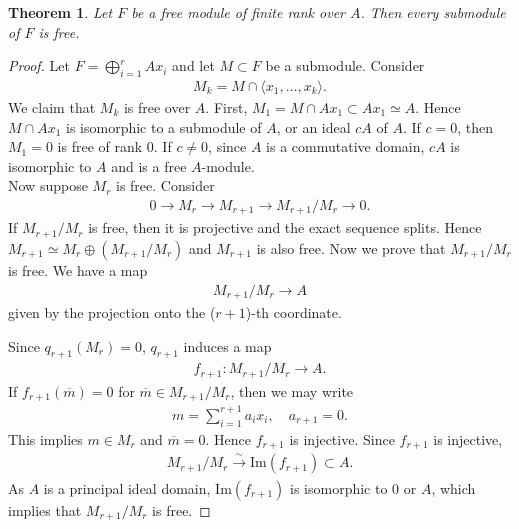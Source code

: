 \documentclass[12pt]{report}
\theoremstyle{plain}
\newtheorem{theorem}{Theorem}[section]
\theoremstyle{remark}
\theoremstyle{definition}
\begin{document}
\begin{theorem}
    Let $F$ be a free module of finite rank over $A$. Then every submodule of $F$ is free.
\end{theorem}
\begin{proof}
    Let $F=\bigoplus_{i=1}^r Ax_i$ and let $M\subset F$ be a submodule. Consider
    \begin{align*}
        M_k = M\cap \langle x_1,\dots,x_k\rangle.
    \end{align*}
    We claim that $M_k$ is free over $A$. First, $M_1=M\cap Ax_1\subset Ax_1\simeq A$. Hence $M\cap Ax_1$ is isomorphic to a submodule of $A$, or an ideal $cA$ of $A$. If $c=0$, then $M_1=0$ is free of rank $0$. If $c\neq 0$, since $A$ is a commutative domain, $cA$ is isomorphic to $A$ and is a free $A$-module. \\
    Now suppose $M_r$ is free. Consider
    \begin{align*}
        0\to M_r \to M_{r+1} \to M_{r+1}/M_r \to 0.
    \end{align*}
    If $M_{r+1}/M_r$ is free, then it is projective and the exact sequence splits. Hence $M_{r+1}\simeq M_r\oplus (M_{r+1}/M_r)$ and $M_{r+1}$ is also free. Now we prove that $M_{r+1}/M_r$ is free. We have a map
    \begin{align*}
        M_{r+1}/M_r\rightarrow A
    \end{align*}
    given by the projection onto the ($r+1$)-th coordinate.
    \begin{figure}[H]
        \centering
    \end{figure}
    \noindent Since $q_{r+1}(M_r)=0$, $q_{r+1}$ induces a map
    \begin{align*}
        f_{r+1}:M_{r+1}/M_r\to A.
    \end{align*}
    If $f_{r+1}(\overline{m})=0$ for $\overline{m}\in M_{r+1}/M_r$, then we may write
    \begin{align*}
        m=\sum_{i=1}^{r+1}a_ix_i,\quad a_{r+1}=0.
    \end{align*}
    This implies $m\in M_r$ and $\overline{m}=0$. Hence $f_{r+1}$ is injective. Since $f_{r+1}$ is injective,
    \begin{align*}
        M_{r+1}/M_r \xrightarrow[]{\sim} \mathrm{Im}(f_{r+1})\subset A.
    \end{align*}
    As $A$ is a principal ideal domain, $\mathrm{Im}(f_{r+1})$ is isomorphic to $0$ or $A$, which implies that $M_{r+1}/M_r$ is free.
\end{proof}
\end{document}
